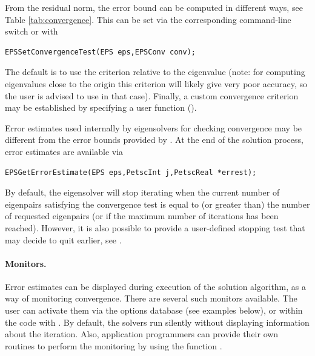 From the residual norm, the error bound can be computed in different ways, see Table \ref{tab:convergence}. This can be set via the corresponding command-line switch or with
        \begin{Verbatim}[fontsize=\small]
        EPSSetConvergenceTest(EPS eps,EPSConv conv);
        \end{Verbatim}
The default is to use the criterion relative to the eigenvalue (note: for computing eigenvalues close to the origin this criterion will likely give very poor accuracy, so the user is advised to use  in that case). Finally, a custom convergence criterion may be established by specifying a user function ().

Error estimates used internally by eigensolvers for checking convergence may be different from the error bounds provided by . At the end of the solution process, error estimates are available via
        \begin{Verbatim}[fontsize=\small]
        EPSGetErrorEstimate(EPS eps,PetscInt j,PetscReal *errest);
        \end{Verbatim}

By default, the eigensolver will stop iterating when the current number of eigenpairs satisfying the convergence test is equal to (or greater than) the number of requested eigenpairs (or if the maximum number of iterations has been reached). However, it is also possible to provide a user-defined stopping test that may decide to quit earlier, see .

\paragraph{Monitors.}

Error estimates can be displayed during execution of the solution algorithm, as a way of monitoring convergence. There are several such monitors available. The user can activate them via the options database (see examples below), or within the code with . By default, the solvers run silently without displaying information about the iteration. Also, application programmers can provide their own routines to perform the monitoring by using the function .


